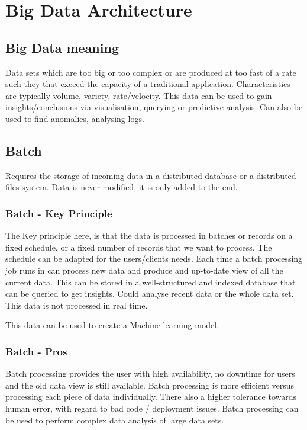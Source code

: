 \chapter{Big Data Architecture}

\section{Big Data meaning}
Data sets which are too big or too complex or are produced at too fast of a rate such they that exceed the capacity of a traditional application.
Characteristics are typically volume, variety, rate/velocity.
This data can be used to gain insights/conclusions via visualisation, querying or predictive analysis.
Can also be used to find anomalies, analysing logs.

\section{Batch}
Requires the storage of incoming data in a distributed database or a distributed files system.
Data is never modified, it is only added to the end.

\subsection{Batch - Key Principle}

The Key principle here, is that the data is processed in batches or records on a fixed schedule, or a fixed number of records that we want to process.
The schedule can be adapted for the users/clients needs.
Each time a batch processing job runs in can process new data and produce and up-to-date view of all the current data.
This can be stored in a well-structured and indexed database that can be queried to get insights.
Could analyse recent data or the whole data set.
This data is not processed in real time.

\begin{note}
    This data can be used to create a Machine learning model.
\end{note}

\subsection{Batch - Pros}
Batch processing provides the user with high availability, no downtime for users and the old data view is still available.
Batch processing is more efficient versus processing each piece of data individually.
There also a higher tolerance towards human error, with regard to bad code / deployment issues.
Batch processing can be used to perform complex data analysis of large data sets.

